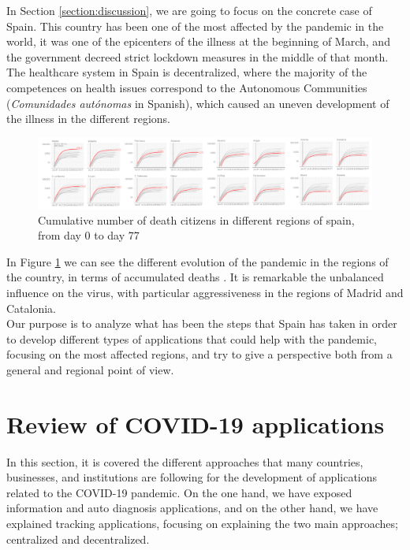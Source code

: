 \documentclass[a4paper, 12pt]{article}
\begin{document}
In Section \ref{section:discussion}, we are going to focus on the concrete case of Spain. This country has been one of the most affected by the pandemic in the world, it was one of the epicenters of the illness at the beginning of March, and the government decreed strict lockdown measures in the middle of that month. The healthcare system in Spain is decentralized, where the majority of the competences on health issues correspond to the Autonomous Communities (\textit{Comunidades autónomas} in Spanish), which caused an uneven development of the illness in the different regions.

\begin{figure}[h]
    \centering
    \includegraphics[width=\columnwidth]{images/introduction/covid-cases-spain.png}
    \caption{Cumulative number of death citizens in different regions of spain, from day 0 to day 77}
    \label{fig:spain-evolution-regions}
\end{figure}

In Figure \ref{fig:spain-evolution-regions} we can see the different evolution of the pandemic in the regions of the country, in terms of accumulated deaths \cite{spain-covid}. It is remarkable the unbalanced influence on the virus, with particular aggressiveness in the regions of Madrid and Catalonia.\\

Our purpose is to analyze what has been the steps that Spain has taken in order to develop different types of applications that could help with the pandemic, focusing on the most affected regions, and try to give a perspective both from a general and regional point of view.


\section{Review of COVID-19 applications}
\label{section:review}

In this section, it is covered the different approaches that many countries, businesses, and institutions are following for the development of applications related to the COVID-19 pandemic. On the one hand, we have exposed information and auto diagnosis applications, and on the other hand, we have explained tracking applications, focusing on explaining the two main approaches; centralized and decentralized.
\end{document}

